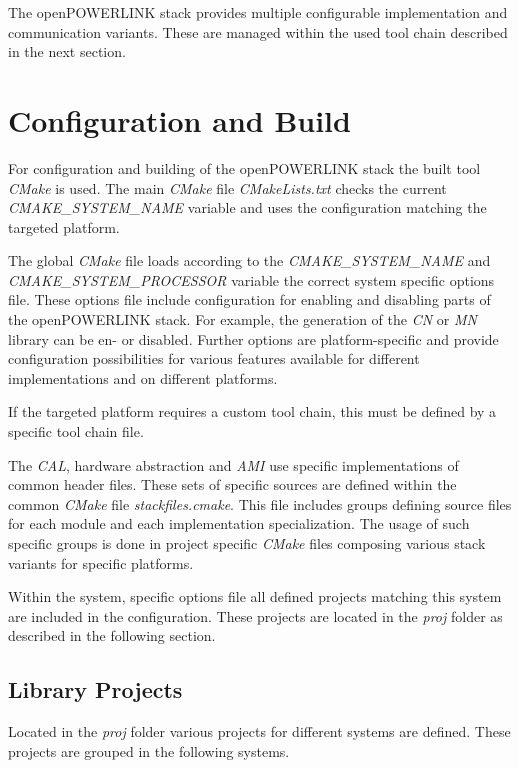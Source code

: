 The openPOWERLINK stack provides multiple configurable implementation and communication variants.
These are managed within the used tool chain described in the next section.

\section{Configuration and Build}
\label{sec:oplk_build}
For configuration and building of the openPOWERLINK stack the built tool \emph{CMake} is used.
The main \emph{CMake} file \emph{CMakeLists.txt} checks the current \emph{CMAKE\_SYSTEM\_NAME} variable and uses the configuration matching the targeted platform.

\begin{sloppypar}
The global \emph{CMake} file loads according to the \emph{CMAKE\_SYSTEM\_NAME} and \emph{CMAKE\_SYSTEM\_PROCESSOR} variable the correct system specific options file.
These options file include configuration for enabling and disabling parts of the openPOWERLINK stack.
For example, the generation of the \emph{CN} or \emph{MN} library can be en- or disabled.
Further options are platform-specific and provide configuration possibilities for various features available for different implementations and on different platforms.
\end{sloppypar}

If the targeted platform requires a custom tool chain, this must be defined by a specific tool chain file.

The \emph{CAL}, hardware abstraction and \emph{AMI} use specific implementations of common header files.
These sets of specific sources are defined within the common \emph{CMake} file \emph{stackfiles.cmake}.
This file includes groups defining source files for each module and each implementation specialization.
The usage of such specific groups is done in project specific \emph{CMake} files composing various stack variants for specific platforms. \cite[Building openPOWERLINK]{openpowerlink_doc}

Within the system, specific options file all defined projects matching this system are included in the configuration.
These projects are located in the \emph{proj} folder as described in the following section.

\subsection{Library Projects}
\label{sec:oplk_structure_proj}
Located in the \emph{proj} folder various projects for different systems are defined.
These projects are grouped in the following systems.

